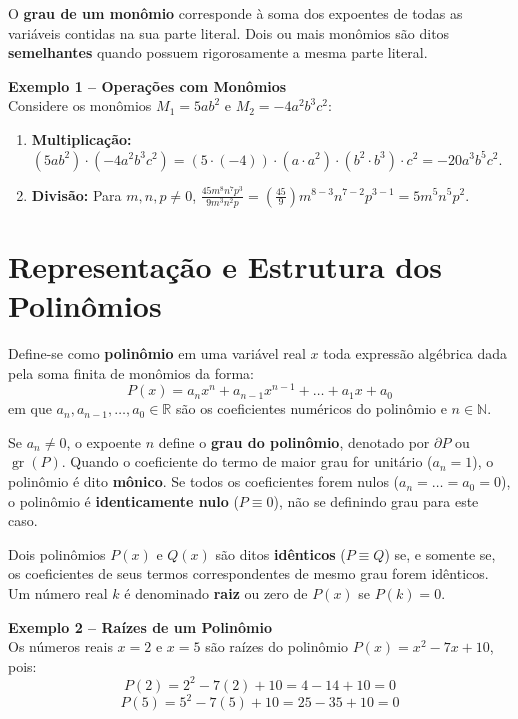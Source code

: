 \documentclass[12pt,a4paper]{article}
\begin{document}
O \textbf{grau de um monômio} corresponde à soma dos expoentes de todas as variáveis contidas na sua parte literal. Dois ou mais monômios são ditos \textbf{semelhantes} quando possuem rigorosamente a mesma parte literal.

\begin{destaquebox}
\textbf{Exemplo 1 -- Operações com Monômios}\\
Considere os monômios $M_1 = 5ab^2$ e $M_2 = -4a^2b^3c^2$:
\begin{enumerate}[label=\alph*)]
    \item \textbf{Multiplicação:} $(5ab^2) \cdot (-4a^2b^3c^2) = (5 \cdot (-4)) \cdot (a \cdot a^2) \cdot (b^2 \cdot b^3) \cdot c^2 = -20a^3b^5c^2$.
    \item \textbf{Divisão:} Para $m, n, p \neq 0$, $\frac{45m^8n^7p^3}{9m^3n^2p} = \left(\frac{45}{9}\right) m^{8-3} n^{7-2} p^{3-1} = 5m^5n^5p^2$.
\end{enumerate}
\end{destaquebox}

\section{Representação e Estrutura dos Polinômios}

Define-se como \textbf{polinômio} em uma variável real $x$ toda expressão algébrica dada pela soma finita de monômios da forma:
\[ P(x) = a_n x^n + a_{n-1} x^{n-1} + \dots + a_1 x + a_0 \]
em que $a_n, a_{n-1}, \dots, a_0 \in \mathbb{R}$ são os coeficientes numéricos do polinômio e $n \in \mathbb{N}$.

Se $a_n \neq 0$, o expoente $n$ define o \textbf{grau do polinômio}, denotado por $\partial P$ ou $\operatorname{gr}(P)$. Quando o coeficiente do termo de maior grau for unitário ($a_n = 1$), o polinômio é dito \textbf{mônico}. Se todos os coeficientes forem nulos ($a_n = \dots = a_0 = 0$), o polinômio é \textbf{identicamente nulo} ($P \equiv 0$), não se definindo grau para este caso.

Dois polinômios $P(x)$ e $Q(x)$ são ditos \textbf{idênticos} ($P \equiv Q$) se, e somente se, os coeficientes de seus termos correspondentes de mesmo grau forem idênticos. Um número real $k$ é denominado \textbf{raiz} ou zero de $P(x)$ se $P(k) = 0$.

\begin{destaquebox}
\textbf{Exemplo 2 -- Raízes de um Polinômio}\\
Os números reais $x = 2$ e $x = 5$ são raízes do polinômio $P(x) = x^2 - 7x + 10$, pois:
\[ P(2) = 2^2 - 7(2) + 10 = 4 - 14 + 10 = 0 \]
\[ P(5) = 5^2 - 7(5) + 10 = 25 - 35 + 10 = 0 \]
\end{destaquebox}
\end{document}
